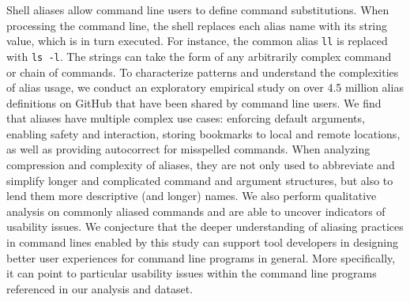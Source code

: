 Shell aliases allow command line users to define command substitutions.
When processing the command line, the shell replaces each alias name with its string value, which is in turn executed.
For instance, the common alias \verb|ll| is replaced with \verb|ls -l|.
The strings can take the form of any arbitrarily complex command or chain of commands.
To characterize patterns and understand the complexities of alias usage, we conduct an exploratory empirical study on over 4.5 million alias definitions on GitHub that have been shared by command line users.
We find that aliases have multiple complex use cases: enforcing default arguments, enabling safety and interaction, storing bookmarks to local and remote locations, as well as providing autocorrect for misspelled commands.
When analyzing compression and complexity of aliases, they are not only used to abbreviate and simplify longer and complicated command and argument structures, but also to lend them more descriptive (and longer) names.
We also perform qualitative analysis on commonly aliased commands and are able to uncover indicators of usability issues.
We conjecture that the deeper understanding of aliasing practices in command lines enabled by this study can support tool developers in designing better user experiences for command line programs in general.
More specifically, it can point to particular usability issues within the command line programs referenced in our analysis and dataset.